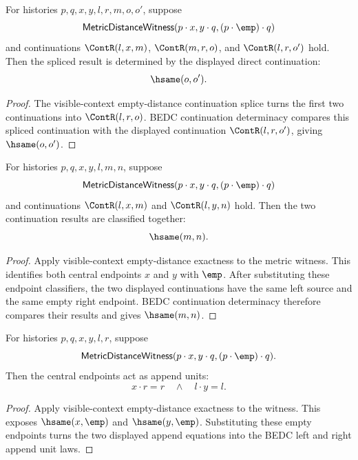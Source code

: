\begin{theorem}
\label{thm:metric-distance-witness-visible-context-empty-distance-continuation-splice-hsame}
For histories $p,q,x,y,l,r,m,o,o'$, suppose
$$
\mathsf{MetricDistanceWitness}(p\cdot x,y\cdot q,(p\cdot\emp)\cdot q)
$$
and continuations $\ContR(l,x,m)$, $\ContR(m,r,o)$, and $\ContR(l,r,o')$
hold. Then the spliced result is determined by the displayed direct
continuation:
$$
\hsame(o,o').
$$
\end{theorem}
\begin{proof}
The visible-context empty-distance continuation splice turns the first two
continuations into $\ContR(l,r,o)$. BEDC continuation determinacy compares this
spliced continuation with the displayed continuation $\ContR(l,r,o')$, giving
$\hsame(o,o')$.
\end{proof}

\begin{theorem}
\label{thm:metric-distance-witness-visible-context-empty-distance-continuation-results-hsame}
For histories $p,q,x,y,l,m,n$, suppose
$$
\mathsf{MetricDistanceWitness}(p\cdot x,y\cdot q,(p\cdot\emp)\cdot q)
$$
and continuations $\ContR(l,x,m)$ and $\ContR(l,y,n)$ hold. Then the two
continuation results are classified together:
$$
\hsame(m,n).
$$
\end{theorem}
\begin{proof}
Apply visible-context empty-distance exactness to the metric witness. This
identifies both central endpoints $x$ and $y$ with $\emp$. After substituting
these endpoint classifiers, the two displayed continuations have the same
left source and the same empty right endpoint. BEDC continuation determinacy
therefore compares their results and gives $\hsame(m,n)$.
\end{proof}

\begin{theorem}
\label{thm:metric-distance-witness-visible-context-empty-distance-append-unit-laws}
For histories $p,q,x,y,l,r$, suppose
$$
\mathsf{MetricDistanceWitness}(p\cdot x,y\cdot q,(p\cdot\emp)\cdot q).
$$
Then the central endpoints act as append units:
$$
x\cdot r=r\quad\wedge\quad l\cdot y=l.
$$
\end{theorem}
\begin{proof}
Apply visible-context empty-distance exactness to the witness. This exposes
$\hsame(x,\emp)$ and $\hsame(y,\emp)$. Substituting these empty endpoints turns
the two displayed append equations into the BEDC left and right append unit
laws.
\end{proof}

